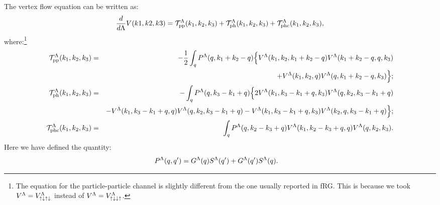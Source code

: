  \begin{widetext} 
The vertex flow equation can be written as: 
\begin{align}
 \frac{d}{d\Lambda}V(k1,k2,k3) =  \mathcal{T}^{\Lambda}_{\mathrm{pp}}(k_1,k_2,k_3) +  
  \mathcal{T}^{\Lambda}_{\mathrm{ph}}(k_1,k_2,k_3) + \mathcal{T}^{\Lambda}_{\mathrm{phc}}(k_1,k_2,k_3),
\end{align} 
where:\footnote{The equation for the particle-particle channel is slightly different from the one usually reported in fRG. This is because we took $V^{\Lambda}_{\mathrm{}} = V^{\Lambda}_{\mathrm{\uparrow \downarrow \uparrow\downarrow}}$ instead of $V^{\Lambda}_{\mathrm{}} = V^{\Lambda}_{\mathrm{\uparrow\downarrow\downarrow\uparrow}}$.  }
\begin{eqnarray} 
\mathcal{T}^{\Lambda}_{\mathrm{pp}}(k_1,k_2,k_3) &=&-\frac{1}{2} \int_q {P}^{\Lambda}_{\mathrm{}}(q,k_1+k_2-q) \Big\{  V^{\Lambda}_{\mathrm{}}(k_1,k_2,k_1+k_2-q)V^{\Lambda}_{\mathrm{}}(k_1+k_2-q,q,k_3)   \\ 
\nonumber
&&+  V^{\Lambda}_{\mathrm{}}(k_1,k_2,q)V^{\Lambda}_{\mathrm{}}(q,k_1+k_2-q,k_3) \Big\} ; \\  
\mathcal{T} ^{\Lambda}_{\mathrm{ph}}(k_1,k_2,k_3) & =& -\int_q P^{\Lambda}_{\mathrm{}}(q,k_3-k_1+q)
\Big\{ 2 V^{\Lambda}_{\mathrm{}}( k_1,k_3-k_1+q,k_3)  V^{\Lambda}_{\mathrm{}}(q,k_2,k_3-k_1+q) \\
\nonumber
&&- V^{\Lambda}_{\mathrm{}}( k_1,k_3-k_1+q,q)  V^{\Lambda}_{\mathrm{}}(q,k_2,k_3-k_1+q) - V^{\Lambda}_{\mathrm{}}( k_1,k_3-k_1+q,k_3)  V^{\Lambda}_{\mathrm{}}(k_2,q,k_3-k_1+q) \Big\}; \\
\mathcal{T}^{\Lambda}_{\mathrm{phc}}(k_1,k_2,k_3) & =& \int_q P^{\Lambda}_{\mathrm{}}(q,k_2-k_3+q) V^{\Lambda}_{\mathrm{}}(k_1,k_2-k_3+q,q)
V^{\Lambda}_{\mathrm{}}(q,k_2,k_3).
\end{eqnarray} 
Here we have defined the quantity:
\begin{align}
{P }^{\Lambda}_{\mathrm{}}(q,q') &= G^\Lambda(q)S^\Lambda(q') +G^\Lambda(q')S^\Lambda(q).
\end{align} 




\end{widetext} 
